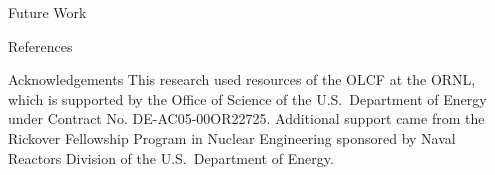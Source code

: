 \documentclass[final]{beamer}
\begin{document}
\begin{frame}{}
\begin{columns}[t]
\begin{column}{.3\linewidth}
\begin{block}{\large Future Work}
        	\end{block}
			\vfill
        	\begin{block}{\large References}
			\printbibliography
        	\end{block}
			\vfill
        	\begin{block}{\large Acknowledgements}
		\justifying
This research used resources of the OLCF at the ORNL, which is supported by the Office of Science of the U.S.\ Department of Energy under Contract No. DE-AC05-00OR22725. Additional support came from the Rickover Fellowship Program in Nuclear Engineering sponsored by Naval Reactors Division of the U.S.\ Department of Energy.
        	\end{block}
      \end{column}
    \end{columns}
  \end{frame}
\end{document}

